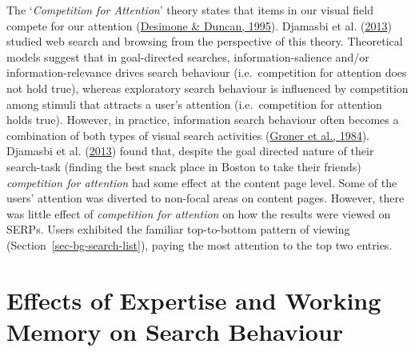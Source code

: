 \documentclass[letterpaper, nobind]{templates/ociamthesis}
\begin{document}
The `\emph{Competition for Attention}' theory states that items in our visual
field compete for our attention (\protect\hyperlink{ref-desimone1995neural}{Desimone \& Duncan, 1995}). Djamasbi et al. (\protect\hyperlink{ref-30}{2013}) studied web
search and browsing from the perspective of this theory. Theoretical
models suggest that in goal-directed searches, information-salience
and/or information-relevance drives search behaviour (i.e.~competition
for attention does not hold true), whereas exploratory search behaviour
is influenced by competition among stimuli that attracts a user's
attention (i.e.~competition for attention holds true). However, in
practice, information search behaviour often becomes a combination of
both types of visual search activities (\protect\hyperlink{ref-groner1984looking}{Groner et al., 1984}). Djamasbi et al. (\protect\hyperlink{ref-30}{2013}) found
that, despite the goal directed nature of their search-task (finding the
best snack place in Boston to take their friends) \emph{competition for
attention} had some effect at the content page level. Some of the users'
attention was diverted to non-focal areas on content pages. However,
there was little effect of \emph{competition for attention} on how the
results were viewed on SERPs. Users exhibited the familiar top-to-bottom
pattern of viewing
(Section~\ref{sec-bg-search-list}), paying the most attention to the top
two entries.

\hypertarget{sec-bg-search-expertise}{%
\section{Effects of Expertise and Working Memory on Search Behaviour}\label{sec-bg-search-expertise}}
\end{document}
